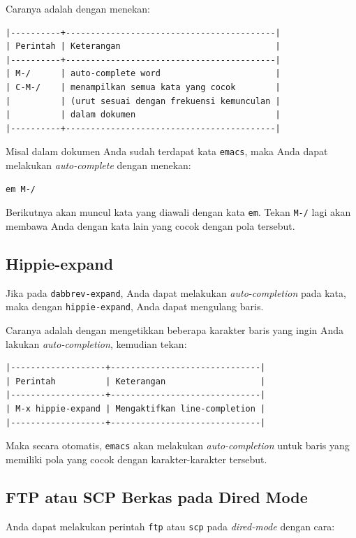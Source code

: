 \documentclass{article}
\begin{document}
Caranya adalah dengan menekan:

\begin{verbatim}
|----------+------------------------------------------|
| Perintah | Keterangan                               |
|----------+------------------------------------------|
| M-/      | auto-complete word                       |
| C-M-/    | menampilkan semua kata yang cocok        |
|          | (urut sesuai dengan frekuensi kemunculan |
|          | dalam dokumen                            |
|----------+------------------------------------------|
\end{verbatim}

Misal dalam dokumen Anda sudah terdapat kata \verb=emacs=, maka Anda dapat
melakukan \emph{auto-complete} dengan menekan:

\begin{verbatim}
em M-/
\end{verbatim}

Berikutnya akan muncul kata yang diawali dengan kata \verb=em=. Tekan 
\verb=M-/= lagi akan membawa Anda dengan kata lain yang cocok dengan pola
tersebut.

\subsection{Hippie-expand}
Jika pada \verb=dabbrev-expand=, Anda dapat melakukan \emph{auto-completion}
pada kata, maka dengan \verb=hippie-expand=, Anda dapat mengulang baris.

Caranya adalah dengan mengetikkan beberapa karakter baris yang ingin Anda 
lakukan \emph{auto-completion}, kemudian tekan:

\begin{verbatim}
|-------------------+------------------------------|
| Perintah          | Keterangan                   |
|-------------------+------------------------------|
| M-x hippie-expand | Mengaktifkan line-completion |
|-------------------+------------------------------|
\end{verbatim}

Maka secara otomatis, \verb=emacs= akan melakukan \emph{auto-completion}
untuk baris yang memiliki pola yang cocok dengan karakter-karakter tersebut.


\subsection{FTP atau SCP Berkas pada Dired Mode}
Anda dapat melakukan perintah \verb=ftp= atau \verb=scp= pada \emph{dired-mode}
dengan cara:
\end{document}
